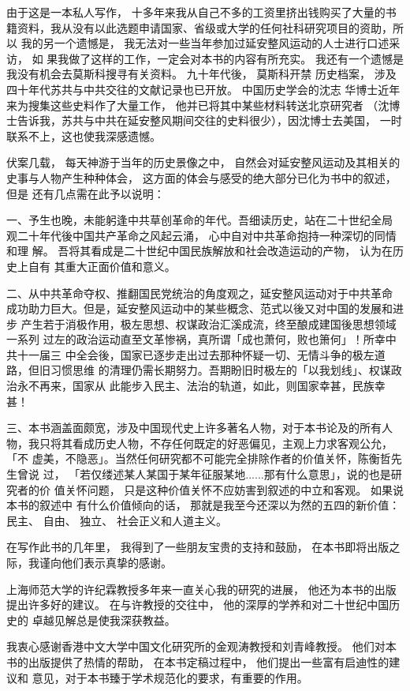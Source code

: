 \begin{preface}
由于这是一本私人写作，
十多年来我从自己不多的工资里挤出钱购买了大量的书
籍资料，我从没有以此选题申请国家、省级或大学的任何社科研究项目的资助，所以
我的另一个遗憾是，
我无法对一些当年参加过延安整风运动的人士进行口述采访，
如
果我做了这样的工作，一定会对本书的内容有所充实。
我还有一个遗憾是我没有机会去莫斯科搜寻有关资料。
九十年代後，
莫斯科开禁
历史档案，
涉及四十年代苏共与中共交往的文献记录也已开放。
中国历史学会的沈志
华博士近年来为搜集这些史料作了大量工作，
他并已将其中某些材料转送北京研究者
（沈博士告诉我，苏共与中共在延安整风期间交往的史料很少），因沈博士去美国，
一时联系不上，这也使我深感遗憾。

伏案几载，
每天神游于当年的历史景像之中，
自然会对延安整风运动及其相关的
史事与人物产生种种体会，
这方面的体会与感受的绝大部分已化为书中的叙述，
但是
还有几点需在此予以说明：

一、予生也晚，未能躬逢中共草创革命的年代。吾细读历史，站在二十世纪全局
观二十年代後中国共产革命之风起云涌，
心中自对中共革命抱持一种深切的同情和理
解。
吾将其看成是二十世纪中国民族解放和社会改造运动的产物，
认为在历史上自有
其重大正面价值和意义。

二、从中共革命夺权、推翻国民党统治的角度观之，延安整风运动对于中共革命
成功助力巨大。但是，延安整风运动中的某些概念、范式以後又对中国的发展和进步
产生若于消极作用，极左思想、权谋政治汇溪成流，终至酿成建国後思想领域一系列
过左的政治运动直至文革惨祸，真所谓「成也萧何，败也箫何」！所幸中共十一届三
中全会後，国家已逐步走出过去那种怀疑一切、无情斗争的极左道路，但旧习惯思维
的清理仍需长期努力。吾期盼旧时极左的「以我划线」、权谋政治永不再来，国家从
此能步入民主、法治的轨道，如此，则国家幸甚，民族幸甚！

三、本书涵盖面颇宽，涉及中国现代史上许多著名人物，对于本书论及的所有人
物，我只将其看成历史人物，不存任何既定的好恶偏见，主观上力求客观公允，「不
虚美，不隐恶」。当然任何研究都不可能完全排除作者的价值关怀，陈衡哲先生曾说
过，
「若仅缕述某人某国于某年征服某地......那有什么意思」，说的也是研究者的价
值关怀问题，
只是这种价值关怀不应妨害到叙述的中立和客观。
如果说本书的叙述中
有什么价值倾向的话，
那就是我至今还深以为然的五四的新价值：
民主、
自由、
独立、
社会正义和人道主义。

在写作此书的几年里，
我得到了一些朋友宝贵的支持和鼓励，
在本书即将出版之
际，我谨向他们表示真挚的感谢。

上海师范大学的许纪霖教授多年来一直关心我的研究的进展，
他还为本书的出版
提出许多好的建议。
在与许教授的交往中，
他的深厚的学养和对二十世纪中国历史的
卓越见解总是使我深获教益。

我衷心感谢香港中文大学中国文化研究所的金观涛教授和刘青峰教授。
他们对本
书的出版提供了热情的帮助，
在本书定稿过程中，
他们提出一些富有启迪性的建议和
意见，对于本书臻于学术规范化的要求，有重要的作用。


\end{preface}
